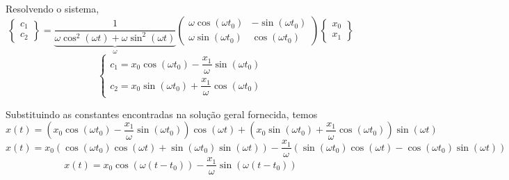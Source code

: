 \documentclass[oneside,12pt,a4paper]{report}
\begin{document}
\begin{resolucao}
    Resolvendo o sistema,
    \[\begin{Bmatrix}
        c_1\\
        c_2
    \end{Bmatrix}
    =
    \underbrace{\frac{1}{\omega\cos^2(\omega t)+\omega\sin^2(\omega t)}}_{\omega}
    \begin{pmatrix}
        \omega\cos(\omega t_0) & -\sin(\omega t_0)\\
        \omega\sin(\omega t_0) & \cos(\omega t_0)
    \end{pmatrix}
    \begin{Bmatrix}
        x_0\\
        x_1
    \end{Bmatrix}\]
    \[\begin{cases}
        c_1=x_0\cos(\omega t_0)-\dfrac{x_1}{\omega}\sin(\omega t_0)\\
        c_2=x_0\sin(\omega t_0)+\dfrac{x_1}{\omega}\cos(\omega t_0)
    \end{cases}\]

    Substituindo as constantes encontradas na solução geral fornecida, temos
    \[x(t)=\left(x_0\cos(\omega t_0)-\dfrac{x_1}{\omega}\sin(\omega t_0)\right)\cos(\omega t)+\left(x_0\sin(\omega t_0)+\dfrac{x_1}{\omega}\cos(\omega t_0)\right)\sin(\omega t)\]
    \[x(t)=x_0(\cos(\omega t_0)\cos(\omega t)+\sin(\omega t_0)\sin(\omega t))-\dfrac{x_1}{\omega}(\sin(\omega t_0)\cos(\omega t)-\cos(\omega t_0)\sin(\omega t))\]
    \[\boxed{x(t)=x_0\cos(\omega(t-t_0))-\dfrac{x_1}{\omega}\sin(\omega(t-t_0))}\]
\end{resolucao}
\end{document}
